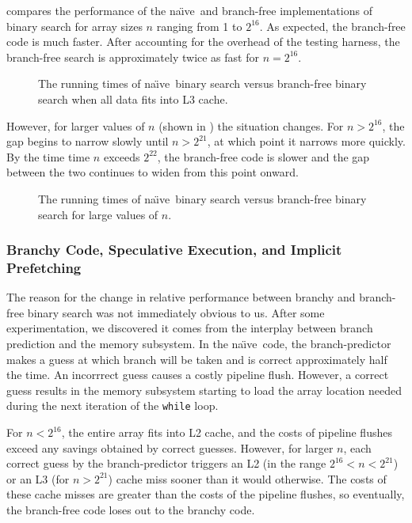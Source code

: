 \documentclass{patmorin}
\newcommand{\naive}{na\"{\i}ve}
\begin{document}
 compares the performance of the \naive\ and
branch-free implementations of binary search for array sizes $n$
ranging from 1 to $2^{16}$.  As expected, the branch-free code is much
faster. After accounting for the overhead of the testing harness, the
branch-free search is approximately twice as fast for $n=2^{16}$.

\begin{figure}
   \caption{The running times of \naive\ binary search versus
    branch-free binary search when all data
    fits into L3 cache.}
\end{figure}

However, for larger values of $n$ (shown in ) the
situation changes.  For $n>2^{16}$, the gap begins to narrow slowly
until $n>2^{21}$, at which point it narrows more quickly.  By the time
time $n$ exceeds $2^{22}$, the branch-free code is slower and the gap
between the two continues to widen from this point onward.

\begin{figure}
   \caption{The running times of \naive\ binary search versus
    branch-free binary search for large values of $n$.}
\end{figure}

\subsubsection{Branchy Code, Speculative Execution, and Implicit Prefetching}

The reason for the change in relative performance between branchy
and branch-free binary search was not immediately obvious to us.
After some experimentation, we discovered it comes from the interplay
between branch prediction and the memory subsystem.  In the \naive\
code, the branch-predictor makes a guess at which branch will be taken
and is correct approximately half the time. An incorrrect guess causes a
costly pipeline flush.  However, a correct guess results in the memory
subsystem starting to load the array location needed during the next
iteration of the \texttt{while} loop.

For $n<2^{16}$, the entire array fits into L2 cache, and the costs
of pipeline flushes exceed any savings obtained by correct guesses.
However, for larger $n$, each correct guess by the branch-predictor
triggers an L2 (in the range $2^{16}<n<2^{21}$) or an L3 (for $n>2^{21}$)
cache miss sooner than it would otherwise.  The costs of these cache
misses are greater than the costs of the pipeline flushes, so eventually,
the branch-free code loses out to the branchy code.
\end{document}
